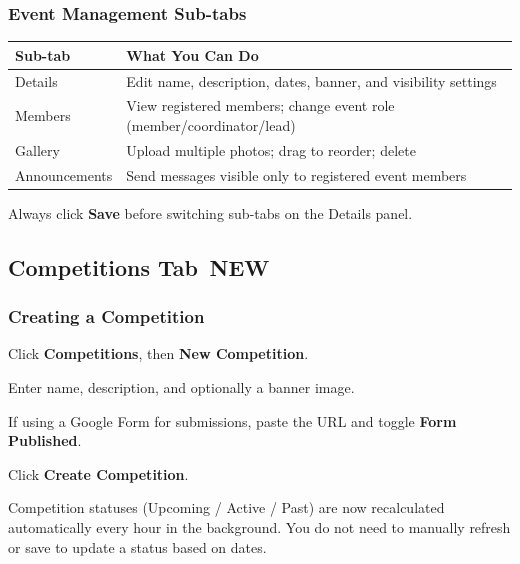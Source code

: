 \documentclass[12pt,a4paper]{article}
\newcommand{\newbadge}{%
  \colorbox{NewFrame}{\color{white}\,\textbf{\footnotesize NEW}\,}%
}
\begin{document}
\subsubsection{Event Management Sub-tabs}

\begin{center}
\renewcommand{\arraystretch}{1.35}
\begin{tabularx}{\linewidth}{L{3.2cm} X}
\toprule
\textbf{Sub-tab} & \textbf{What You Can Do} \\
\midrule
Details & Edit name, description, dates, banner, and visibility settings \\
Members & View registered members; change event role (member/coordinator/lead) \\
Gallery & Upload multiple photos; drag to reorder; delete \\
Announcements & Send messages visible only to registered event members \\
\bottomrule
\end{tabularx}
\end{center}

\begin{tipbox}
Always click \textbf{Save} before switching sub-tabs on the Details panel.
\end{tipbox}

\subsection{Competitions Tab \newbadge}

\subsubsection{Creating a Competition}
\begin{steps}
\item Click \textbf{Competitions}, then \textbf{New Competition}.
\item Enter name, description, and optionally a banner image.
\item If using a Google Form for submissions, paste the URL and toggle \textbf{Form Published}.
\item Click \textbf{Create Competition}.
\end{steps}

\begin{notebox}
Competition statuses (Upcoming / Active / Past) are now recalculated automatically every hour in the background. You do not need to manually refresh or save to update a status based on dates.
\end{notebox}
\end{document}
